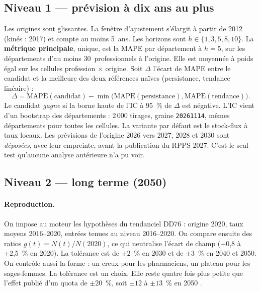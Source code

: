\subsection{Niveau 1 --- prévision à dix ans au plus}
Les origines sont glissantes. La fenêtre d'ajustement s'élargit à partir de 2012 (kinés : 2017) et
compte au moins 5\suppose{}~ans. Les horizons sont $h \in \{1, 3, 5, 8, 10\}$. La \textbf{métrique
principale}, unique, est la MAPE par département à $h = 5$, sur les départements d'au moins
30\suppose{}~professionnels à l'origine. Elle est moyennée à poids égal sur les cellules
profession $\times$ origine. Soit $\Delta$ l'écart de MAPE entre le candidat et la meilleure des deux
références naïves (persistance, tendance linéaire) :
\[
  \Delta = \mathrm{MAPE}(\text{candidat}) - \min\bigl(\mathrm{MAPE}(\text{persistance}),
  \mathrm{MAPE}(\text{tendance})\bigr).
\]
Le candidat \emph{gagne} si la borne haute de l'IC à 95~\% de $\Delta$ est négative. L'IC vient d'un
bootstrap des départements : 2\,000 tirages, graine \texttt{20261114}, mêmes départements pour
toutes les cellules. La variante par défaut est le stock-flux à taux locaux. Les prévisions de
l'origine 2026 vers 2027, 2028 et 2030 sont \emph{déposées}, avec leur empreinte, avant la
publication du RPPS 2027. C'est le seul test qu'aucune analyse antérieure n'a pu voir.

\subsection{Niveau 2 --- long terme (2050)}
\paragraph{Reproduction.} On impose au moteur les hypothèses du tendanciel DD76 : origine 2020, taux
moyens 2016--2020, entrées tenues au niveau 2016--2020. On compare ensuite des ratios
$g(t) = N(t)/N(2020)$, ce qui neutralise l'écart de champ (+0,8 à +2,5\mesure{}~\% en 2020). La
tolérance est de $\pm 2$\suppose{}~\% en 2030 et de $\pm 3$\suppose{}~\% en 2040 et 2050. On
contrôle aussi la forme : un creux pour les pharmaciens, un plateau pour les sages-femmes. La
tolérance est un choix. Elle reste quatre fois plus petite que l'effet publié d'un quota de
$\pm 20$~\%, soit $\pm 12$ à $\pm 13$\mesure{}~\% en 2050 \citep{a3-drees2021dd76}.

